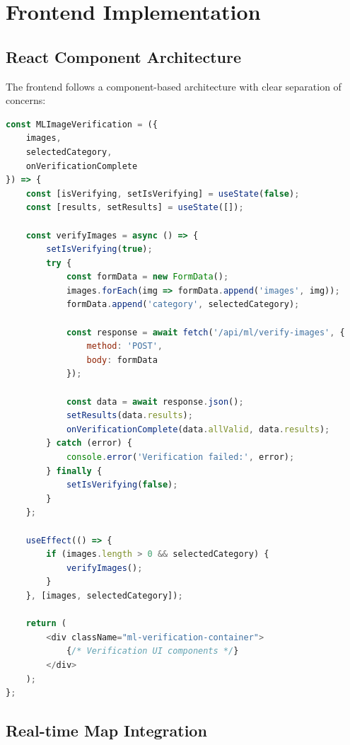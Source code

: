 \documentclass[12pt,a4paper]{article}
\begin{document}
\section{Frontend Implementation}

\subsection{React Component Architecture}

The frontend follows a component-based architecture with clear separation of concerns:

\begin{lstlisting}[language=JavaScript, caption=ML Image Verification Component]
const MLImageVerification = ({ 
    images, 
    selectedCategory, 
    onVerificationComplete 
}) => {
    const [isVerifying, setIsVerifying] = useState(false);
    const [results, setResults] = useState([]);
    
    const verifyImages = async () => {
        setIsVerifying(true);
        try {
            const formData = new FormData();
            images.forEach(img => formData.append('images', img));
            formData.append('category', selectedCategory);
            
            const response = await fetch('/api/ml/verify-images', {
                method: 'POST',
                body: formData
            });
            
            const data = await response.json();
            setResults(data.results);
            onVerificationComplete(data.allValid, data.results);
        } catch (error) {
            console.error('Verification failed:', error);
        } finally {
            setIsVerifying(false);
        }
    };
    
    useEffect(() => {
        if (images.length > 0 && selectedCategory) {
            verifyImages();
        }
    }, [images, selectedCategory]);
    
    return (
        <div className="ml-verification-container">
            {/* Verification UI components */}
        </div>
    );
};
\end{lstlisting}

\subsection{Real-time Map Integration}
\end{document}
